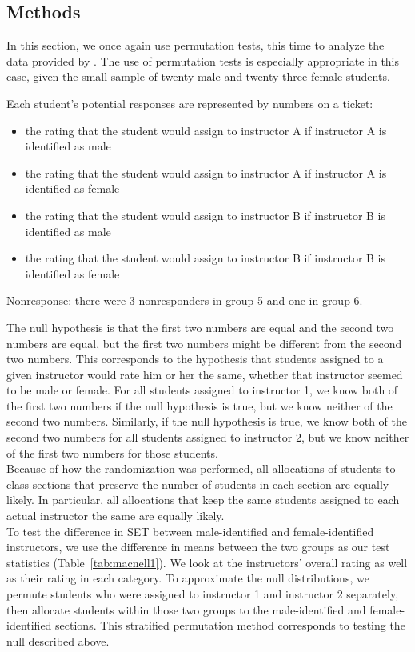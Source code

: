 \documentclass[12pt]{article}
\begin{document}
\subsection{Methods}\label{macnell:methods}
In this section, we once again use permutation tests, this time to analyze the data provided by \citet{MacNell2014}. The use of permutation tests is especially appropriate in this case, given the small sample of twenty male and twenty-three female students.

Each student's potential responses are represented by numbers on a ticket:
\begin{itemize}
\item the rating that the student would assign to instructor A if instructor A is identified as male
\item the rating that the student would assign to instructor A if instructor A is identified as female
\item the rating that the student would assign to instructor B if instructor B is identified as male
\item the rating that the student would assign to instructor B if instructor B is identified as female
\end{itemize}

Nonresponse: there were 3 nonresponders in group 5 and one in group 6.


The null hypothesis is that the first two numbers are equal and the second two numbers are equal, but the first two numbers might be different from the second two numbers. This corresponds to the hypothesis that students assigned to a given instructor would rate him or her the same, whether that instructor seemed to be male or female. For all students assigned to instructor 1, we know both of the first two numbers if the null hypothesis is true, but we know neither of the second two numbers. Similarly, if the null hypothesis is true, we know both of the second two numbers for all students assigned to instructor 2, but we know neither of the first two numbers for those students. \\

Because of how the randomization was performed, all allocations of students to class sections that preserve the number of students in each section are equally likely.  In particular, all allocations that keep the same students assigned to each actual instructor the same are equally likely.  \\

To test the difference in SET between male-identified and female-identified instructors, we use the difference in means between the two groups as our test statistics (Table~\ref{tab:macnell1}).  We look at the instructors' overall rating as well as their rating in each category.  To approximate the null distributions, we permute students who were assigned to instructor 1 and instructor 2 separately, then allocate students within those two groups to the male-identified and female-identified sections.  This stratified permutation method corresponds to testing the null described above. \\
\end{document}
